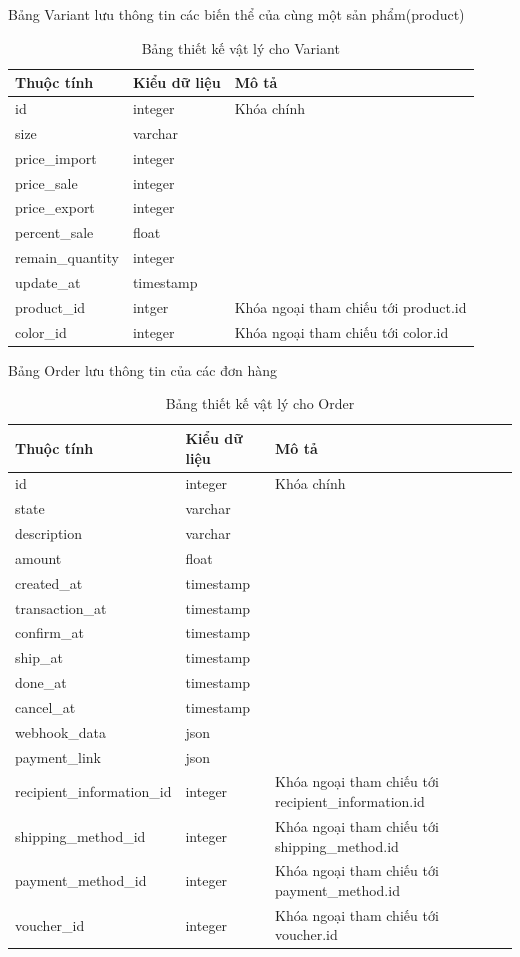 \noindent Bảng Variant lưu thông tin các biến thể của cùng một sản phẩm(product)

\begin{table}[H]
\centering
\begin{tabular}{|p{4cm}|p{3cm}|p{7cm}|}
\hline
Thuộc tính & Kiểu dữ liệu & Mô tả \\
\hline
id & integer & Khóa chính \\
\hline
size & varchar & \\
\hline
price\_import & integer & \\
\hline  
price\_sale & integer & \\
\hline
price\_export & integer & \\
\hline
percent\_sale & float & \\
\hline
remain\_quantity & integer & \\
\hline
update\_at & timestamp & \\
\hline
product\_id & intger & Khóa ngoại tham chiếu tới product.id \\
\hline
color\_id & integer &  Khóa ngoại tham chiếu tới color.id \\
\hline

\end{tabular}
\caption{Bảng thiết kế vật lý cho Variant}
\end{table}

\newpage


\noindent Bảng Order lưu thông tin của các đơn hàng
\begin{table}[H]
\centering
\begin{tabular}{|p{5cm}|p{2cm}|p{7cm}|}
\hline
Thuộc tính & Kiểu dữ liệu & Mô tả \\
\hline
id & integer & Khóa chính \\
\hline
state & varchar & \\
\hline
description & varchar & \\
\hline
amount & float & \\
\hline
created\_at & timestamp & \\
\hline
transaction\_at & timestamp & \\
\hline
confirm\_at & timestamp & \\
\hline
ship\_at & timestamp & \\
\hline
done\_at & timestamp & \\
\hline
cancel\_at & timestamp & \\
\hline
webhook\_data & json & \\
\hline
payment\_link & json & \\
\hline
recipient\_information\_id & integer & Khóa ngoại tham chiếu tới recipient\_information.id \\
\hline
shipping\_method\_id & integer & Khóa ngoại tham chiếu tới shipping\_method.id \\
\hline
payment\_method\_id & integer & Khóa ngoại tham chiếu tới payment\_method.id \\
\hline
voucher\_id & integer & Khóa ngoại tham chiếu tới voucher.id \\
\hline
\end{tabular}
\caption{Bảng thiết kế vật lý cho Order}
\end{table}

